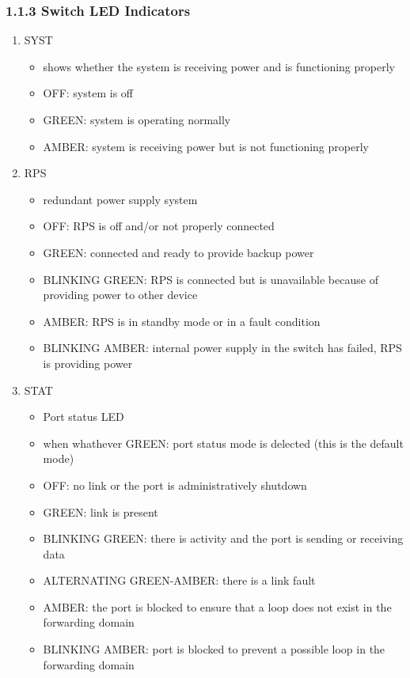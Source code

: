 \documentclass[11pt]{article}
\begin{document}
\subsubsection{1.1.3 Switch LED Indicators}
\label{sec:org94e7d7c}
\begin{enumerate}
\item SYST
\begin{itemize}
\item shows whether the system is receiving power and is functioning properly
\item OFF: system is off
\item GREEN: system is operating normally
\item AMBER: system is receiving power but is not functioning properly
\end{itemize}
\item RPS
\begin{itemize}
\item redundant power supply system
\item OFF: RPS is off and/or not properly connected
\item GREEN: connected and ready to provide backup power
\item BLINKING GREEN: RPS is connected but is unavailable because of
providing power to other device
\item AMBER: RPS is in standby mode or in a fault condition
\item BLINKING AMBER: internal power supply in the switch has failed,
RPS is providing power
\end{itemize}
\item STAT
\begin{itemize}
\item Port status LED
\item when whathever GREEN: port status mode is delected (this is the
default mode)
\item OFF: no link or the port is administratively shutdown
\item GREEN: link is present
\item BLINKING GREEN: there is activity and the port is sending or
receiving data
\item ALTERNATING GREEN-AMBER: there is a link fault
\item AMBER: the port is blocked to ensure that a loop does not exist
in the forwarding domain
\item BLINKING AMBER: port is blocked to prevent a possible loop in the
forwarding domain
\end{itemize}

\end{enumerate}
\end{document}

